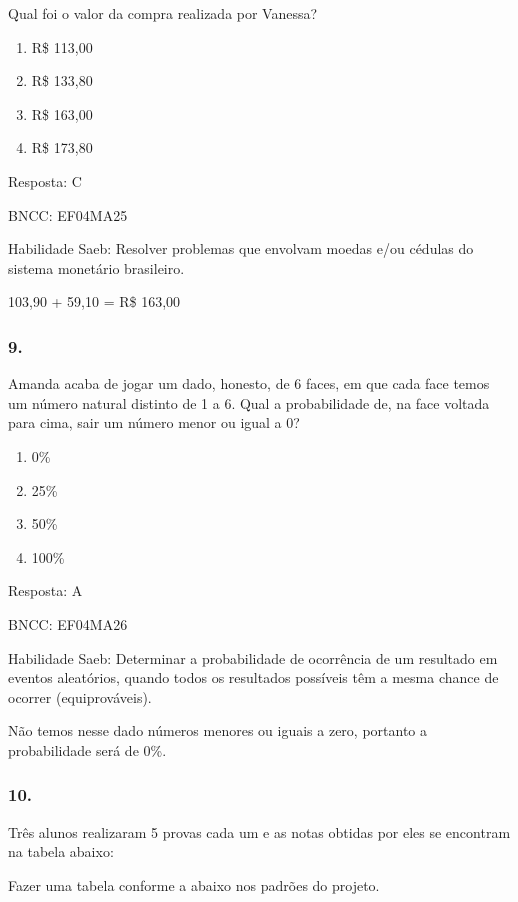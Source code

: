 Qual foi o valor da compra realizada por Vanessa?

\begin{enumerate}
\def\labelenumi{\alph{enumi})}
\item
  R\$ 113,00
\item
  R\$ 133,80
\item
  R\$ 163,00
\item
  R\$ 173,80
\end{enumerate}

Resposta: C

BNCC: EF04MA25

Habilidade Saeb: Resolver problemas que envolvam moedas e/ou cédulas do
sistema monetário brasileiro.

103,90 + 59,10 = R\$ 163,00

\subsubsection{9.}\label{section-165}

Amanda acaba de jogar um dado, honesto, de 6 faces, em que cada face
temos um número natural distinto de 1 a 6. Qual a probabilidade de, na
face voltada para cima, sair um número menor ou igual a 0?

\begin{enumerate}
\def\labelenumi{\alph{enumi})}
\item
  0\%
\item
  25\%
\item
  50\%
\item
  100\%
\end{enumerate}

Resposta: A

BNCC: EF04MA26

Habilidade Saeb: Determinar a probabilidade de ocorrência de um
resultado em eventos aleatórios, quando todos os resultados possíveis
têm a mesma chance de ocorrer (equiprováveis).

Não temos nesse dado números menores ou iguais a zero, portanto a
probabilidade será de 0\%.

\subsubsection{10.}\label{section-166}

Três alunos realizaram 5 provas cada um e as notas obtidas por eles se
encontram na tabela abaixo:

Fazer uma tabela conforme a abaixo nos padrões do projeto.

